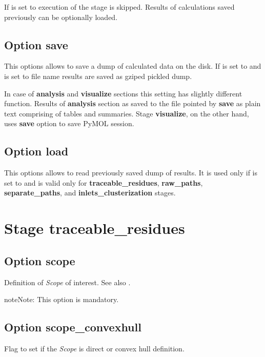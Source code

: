 \documentclass[a4paper,10pt,english]{sphinxmanual}
\begin{document}
If  is set to  execution of the stage is skipped. Results of calculations saved previously can be optionally loaded.


\subsection{Option \textbf{save}}
\label{valve/valve_config:option-save}
This options allows to save a dump of calculated data on the disk. If  is set to  and  is set to file name results are saved as gziped pickled dump.

In case of \textbf{analysis} and \textbf{visualize} sections this setting has slightly different function. Results of \textbf{analysis} section as saved to the file pointed by \textbf{save} as plain text comprising of tables and summaries. Stage \textbf{visualize}, on the other hand, uses \textbf{save} option to save PyMOL session.


\subsection{Option \textbf{load}}
\label{valve/valve_config:option-load}
This options allows to read previously saved dump of results. It is used only if  is set to  and is valid only for \textbf{traceable\_residues}, \textbf{raw\_paths}, \textbf{separate\_paths}, and \textbf{inlets\_clusterization} stages.


\section{Stage \textbf{traceable\_residues}}
\label{valve/valve_config:stage-traceable-residues}

\subsection{Option \textbf{scope}}
\label{valve/valve_config:option-scope}
Definition of \emph{Scope} of interest. See also {\hyperref[valve/valve_manual:scope\string-definition]{}}.

\begin{notice}{note}{Note:}
This option is mandatory.
\end{notice}


\subsection{Option \textbf{scope\_convexhull}}
\label{valve/valve_config:option-scope-convexhull}
Flag to set if the \emph{Scope} is direct or convex hull definition.
\end{document}
